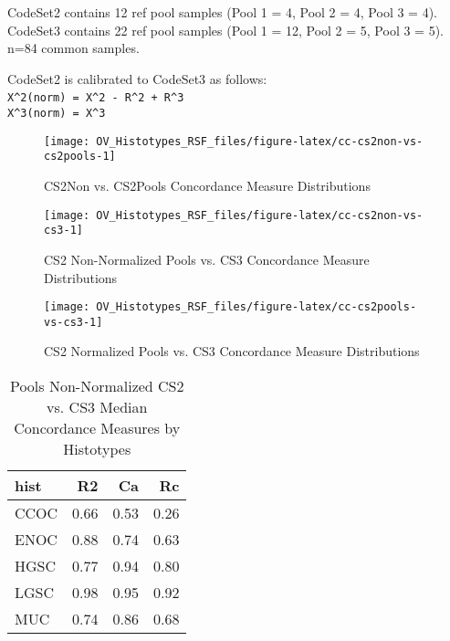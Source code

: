 \documentclass[
]{report}
\begin{document}
CodeSet2 contains 12 ref pool samples (Pool 1 = 4, Pool 2 = 4, Pool 3 = 4). CodeSet3 contains 22 ref pool samples (Pool 1 = 12, Pool 2 = 5, Pool 3 = 5). n=84 common samples.

CodeSet2 is calibrated to CodeSet3 as follows:\\
\texttt{X\^{}2(norm)\ =\ X\^{}2\ -\ R\^{}2\ +\ R\^{}3}~\\
\texttt{X\^{}3(norm)\ =\ X\^{}3}

\begin{figure}[H]

{\centering \texttt{[image: OV\_Histotypes\_RSF\_files/figure-latex/cc-cs2non-vs-cs2pools-1]} 

}

\caption{CS2Non vs. CS2Pools Concordance Measure Distributions}\label{fig:cc-cs2non-vs-cs2pools}
\end{figure}

\begin{figure}[H]

{\centering \texttt{[image: OV\_Histotypes\_RSF\_files/figure-latex/cc-cs2non-vs-cs3-1]} 

}

\caption{CS2 Non-Normalized Pools vs. CS3 Concordance Measure Distributions}\label{fig:cc-cs2non-vs-cs3}
\end{figure}

\begin{figure}[H]

{\centering \texttt{[image: OV\_Histotypes\_RSF\_files/figure-latex/cc-cs2pools-vs-cs3-1]} 

}

\caption{CS2 Normalized Pools vs. CS3 Concordance Measure Distributions}\label{fig:cc-cs2pools-vs-cs3}
\end{figure}

\begin{table}

\caption{\label{tab:pools-cs2non-vs-cs3}Pools Non-Normalized CS2 vs. CS3 Median Concordance Measures by Histotypes}
\centering
\begin{tabular}[t]{l|r|r|r}
\hline
hist & R2 & Ca & Rc\\
\hline
CCOC & 0.66 & 0.53 & 0.26\\
\hline
ENOC & 0.88 & 0.74 & 0.63\\
\hline
HGSC & 0.77 & 0.94 & 0.80\\
\hline
LGSC & 0.98 & 0.95 & 0.92\\
\hline
MUC & 0.74 & 0.86 & 0.68\\
\hline
\end{tabular}
\end{table}
\end{document}
